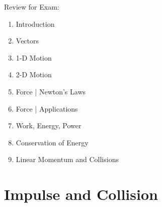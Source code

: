 \documentclass[]{article}
\date{}
\title{\docTitle}
\author{\docAuthor}
\date{\today}
\begin{document}
\maketitle
Review for Exam:
\begin{enumerate}
    \item Introduction
    \item Vectors
    \item 1-D Motion
    \item 2-D Motion
    \item Force | Newton's Laws
    \item Force | Applications
    \item Work, Energy, Power
    \item Conservation of Energy
    \item Linear Momentum and Collisions
\end{enumerate}

\section*{Impulse and Collision}
\end{document}
